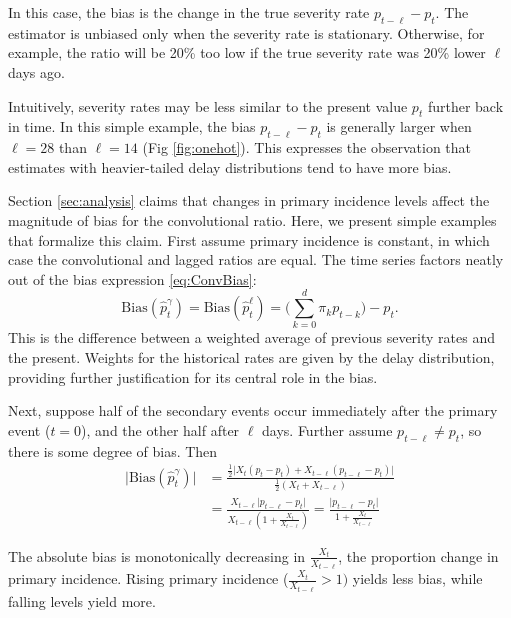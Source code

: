 \documentclass{article}
\begin{document}
In this case, the bias is the change in the true severity rate $p_{t-\ell} - p_t$. The estimator is unbiased only when the severity rate is stationary. Otherwise, for example, the ratio will be 20\% too low if the true severity rate was 20\% lower $\ell$ days ago. 

Intuitively, severity rates may be less similar to the present value $p_t$ further back in time. In this simple example, the bias $p_{t-\ell}-p_t$ is generally larger when $\ell=28$ than $\ell=14$ (Fig \ref{fig:onehot}). This expresses the observation that estimates with heavier-tailed delay distributions tend to have more bias. 


Section \ref{sec:analysis} claims that changes in primary incidence levels affect the magnitude of bias for the convolutional ratio. Here, we present simple examples that formalize this claim. First assume primary incidence is constant, in which case the convolutional and lagged ratios are equal. The time series factors neatly out of the bias expression  \ref{eq:ConvBias}:
$$\text{Bias}(\hat{p}_t^{\gamma}) = \text{Bias}(\hat{p}_t^\ell) = \Big(\sum_{k=0}^d \pi_k p_{t-k}\Big)-p_t.$$
\noindent This is the difference between a weighted average of previous severity rates and the present. Weights for the historical rates are given by the delay distribution, providing further justification for its central role in the bias. 

Next, suppose half of the secondary events occur immediately after the primary event ($t=0$), and the other half after $\ell$ days. Further assume $p_{t-\ell}\neq p_t$, so there is some degree of bias. Then
\begin{align*}
    \lvert\text{Bias}(\hat{p}_t^{\gamma})\rvert &= \frac{\frac{1}{2}\big\lvert X_{t}(p_t-p_t) + X_{t-\ell}(p_{t-\ell}-p_t)\big\rvert}{\frac{1}{2}(X_{t}+X_{t-\ell})} \\
    &=\frac{X_{t-\ell}\lvert p_{t-\ell}-p_t\rvert}{X_{t-\ell}(1+\frac{X_{t}}{X_{t-\ell}})} = \frac{\lvert p_{t-\ell}-p_t \rvert}{1+\frac{X_{t}}{X_{t-\ell}}}
\end{align*}

The absolute bias is monotonically decreasing in $\frac{X_{t}}{X_{t-\ell}}$, the proportion change in primary incidence. Rising primary incidence ($\frac{X_{t}}{X_{t-\ell}}>1)$ yields less bias, while falling levels yield more.
\end{document}
